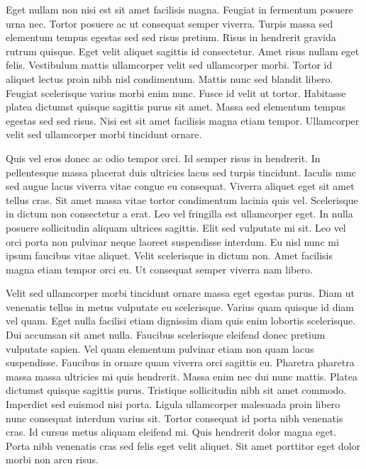 \documentclass[11pt,a4paper]{article}
\begin{document}
Eget nullam non nisi est sit amet facilisis magna. Feugiat in fermentum posuere urna nec. Tortor posuere ac ut consequat semper viverra. Turpis massa sed elementum tempus egestas sed sed risus pretium. Risus in hendrerit gravida rutrum quisque. Eget velit aliquet sagittis id consectetur. Amet risus nullam eget felis. Vestibulum mattis ullamcorper velit sed ullamcorper morbi. Tortor id aliquet lectus proin nibh nisl condimentum. Mattis nunc sed blandit libero. Feugiat scelerisque varius morbi enim nunc. Fusce id velit ut tortor. Habitasse platea dictumst quisque sagittis purus sit amet. Massa sed elementum tempus egestas sed sed risus. Nisi est sit amet facilisis magna etiam tempor. Ullamcorper velit sed ullamcorper morbi tincidunt ornare.

Quis vel eros donec ac odio tempor orci. Id semper risus in hendrerit. In pellentesque massa placerat duis ultricies lacus sed turpis tincidunt. Iaculis nunc sed augue lacus viverra vitae congue eu consequat. Viverra aliquet eget sit amet tellus cras. Sit amet massa vitae tortor condimentum lacinia quis vel. Scelerisque in dictum non consectetur a erat. Leo vel fringilla est ullamcorper eget. In nulla posuere sollicitudin aliquam ultrices sagittis. Elit sed vulputate mi sit. Leo vel orci porta non pulvinar neque laoreet suspendisse interdum. Eu nisl nunc mi ipsum faucibus vitae aliquet. Velit scelerisque in dictum non. Amet facilisis magna etiam tempor orci eu. Ut consequat semper viverra nam libero.

Velit sed ullamcorper morbi tincidunt ornare massa eget egestas purus. Diam ut venenatis tellus in metus vulputate eu scelerisque. Varius quam quisque id diam vel quam. Eget nulla facilisi etiam dignissim diam quis enim lobortis scelerisque. Dui accumsan sit amet nulla. Faucibus scelerisque eleifend donec pretium vulputate sapien. Vel quam elementum pulvinar etiam non quam lacus suspendisse. Faucibus in ornare quam viverra orci sagittis eu. Pharetra pharetra massa massa ultricies mi quis hendrerit. Massa enim nec dui nunc mattis. Platea dictumst quisque sagittis purus. Tristique sollicitudin nibh sit amet commodo. Imperdiet sed euismod nisi porta. Ligula ullamcorper malesuada proin libero nunc consequat interdum varius sit. Tortor consequat id porta nibh venenatis cras. Id cursus metus aliquam eleifend mi. Quis hendrerit dolor magna eget. Porta nibh venenatis cras sed felis eget velit aliquet. Sit amet porttitor eget dolor morbi non arcu risus.
\end{document}
